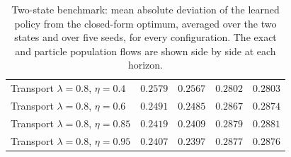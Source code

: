 \begin{table}[H]
\begin{tabular}{lrrrr}
Transport $\lambda=0.8$, $\eta=0.4$ & $0.2579$ & $0.2567$ & $0.2802$ & $0.2803$ \\
Transport $\lambda=0.8$, $\eta=0.6$ & $0.2491$ & $0.2485$ & $0.2867$ & $0.2874$ \\
Transport $\lambda=0.8$, $\eta=0.85$ & $0.2419$ & $0.2409$ & $0.2879$ & $0.2881$ \\
Transport $\lambda=0.8$, $\eta=0.95$ & $0.2407$ & $0.2397$ & $0.2877$ & $0.2876$ \\
\bottomrule
\end{tabular}
\caption{Two-state benchmark: mean absolute deviation of the learned policy from the closed-form optimum, averaged over the two states and over five seeds, for every configuration. The exact and particle population flows are shown side by side at each horizon.}
\label{tab:twostate-policy-error}
\end{table}
